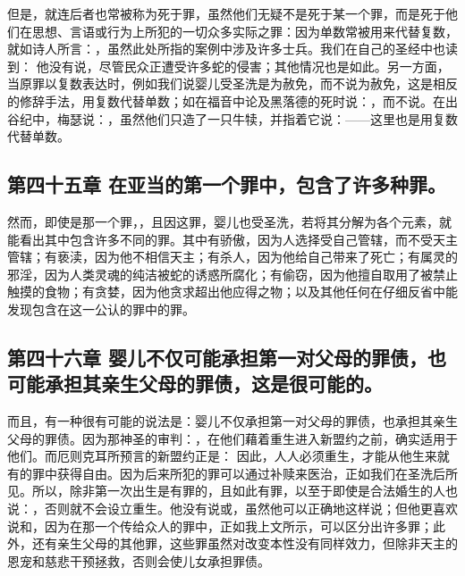 但是，就连后者也常被称为死于罪，虽然他们无疑不是死于某一个罪，而是死于他们在思想、言语或行为上所犯的一切众多实际之罪：因为单数常被用来代替复数，就如诗人所言：，虽然此处所指的案例中涉及许多士兵。我们在自己的圣经中也读到： 他没有说，尽管民众正遭受许多蛇的侵害；其他情况也是如此。另一方面，当原罪以复数表达时，例如我们说婴儿受圣洗是为赦免，而不说为赦免，这是相反的修辞手法，用复数代替单数；如在福音中论及黑落德的死时说：，而不说。在出谷纪中，梅瑟说：，虽然他们只造了一只牛犊，并指着它说：——这里也是用复数代替单数。\par


\subsection{第四十五章  在亚当的第一个罪中，包含了许多种罪。}

然而，即使是那一个罪，，且因这罪，婴儿也受圣洗，若将其分解为各个元素，就能看出其中包含许多不同的罪。其中有骄傲，因为人选择受自己管辖，而不受天主管辖；有亵渎，因为他不相信天主；有杀人，因为他给自己带来了死亡；有属灵的邪淫，因为人类灵魂的纯洁被蛇的诱惑所腐化；有偷窃，因为他擅自取用了被禁止触摸的食物；有贪婪，因为他贪求超出他应得之物；以及其他任何在仔细反省中能发现包含在这一公认的罪中的罪。\par


\subsection{第四十六章  婴儿不仅可能承担第一对父母的罪债，也可能承担其亲生父母的罪债，这是很可能的。}

而且，有一种很有可能的说法是：婴儿不仅承担第一对父母的罪债，也承担其亲生父母的罪债。因为那神圣的审判：，在他们藉着重生进入新盟约之前，确实适用于他们。而厄则克耳所预言的新盟约正是： 因此，人人必须重生，才能从他生来就有的罪中获得自由。因为后来所犯的罪可以通过补赎来医治，正如我们在圣洗后所见。所以，除非第一次出生是有罪的，且如此有罪，以至于即使是合法婚生的人也说：，否则就不会设立重生。他没有说或，虽然他可以正确地这样说；但他更喜欢说和，因为在那一个传给众人的罪中，正如我上文所示，可以区分出许多罪；此外，还有亲生父母的其他罪，这些罪虽然对改变本性没有同样效力，但除非天主的恩宠和慈悲干预拯救，否则会使儿女承担罪债。\par

